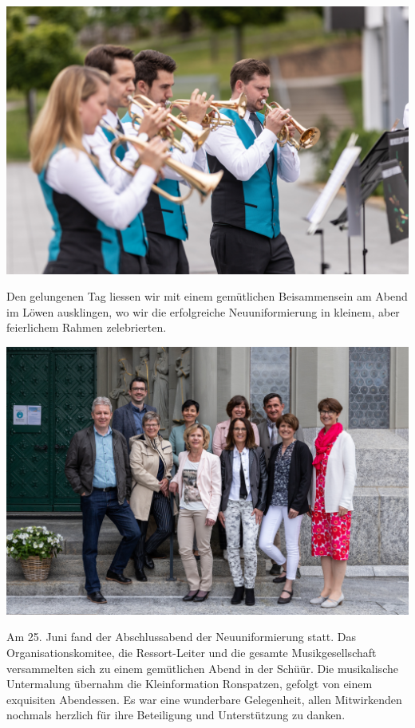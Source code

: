 \begin{history}
    \begin{MulticolFigure}
        \centering
        \includegraphics[width=0.93\linewidth]{./chap/2001-2024/2021/Ensemble-3.jpg}
    \end{MulticolFigure}


    Den gelungenen Tag liessen wir mit einem gemütlichen Beisammensein am Abend
    im Löwen ausklingen, wo wir die erfolgreiche Neuuniformierung in kleinem,
    aber feierlichem Rahmen zelebrierten.

    \begin{MulticolFigure}
        \centering
        \includegraphics[width=0.93\linewidth]{./chap/2001-2024/2021/OK.jpg}
    \end{MulticolFigure}


    Am 25. Juni fand der Abschlussabend der Neuuniformierung statt. Das
    Organisationskomitee, die Ressort-Leiter und die gesamte Musikgesellschaft
    versammelten sich zu einem gemütlichen Abend in der Schüür. Die musikalische
    Untermalung übernahm die Kleinformation Ronspatzen, gefolgt von einem
    exquisiten Abendessen. Es war eine wunderbare Gelegenheit, allen
    Mitwirkenden nochmals herzlich für ihre Beteiligung und Unterstützung zu
    danken.

\end{history}

